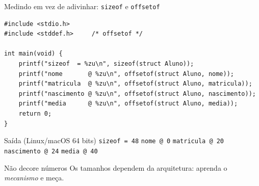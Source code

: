 \documentclass[aspectratio=169]{beamer}
\begin{document}
\begin{frame}[fragile]{Medindo em vez de adivinhar: \texttt{sizeof} e \texttt{offsetof}}
\begin{lstlisting}[basicstyle=\ttfamily\tiny]
#include <stdio.h>
#include <stddef.h>     /* offsetof */

int main(void) {
    printf("sizeof  = %zu\n", sizeof(struct Aluno));
    printf("nome       @ %zu\n", offsetof(struct Aluno, nome));
    printf("matricula  @ %zu\n", offsetof(struct Aluno, matricula));
    printf("nascimento @ %zu\n", offsetof(struct Aluno, nascimento));
    printf("media      @ %zu\n", offsetof(struct Aluno, media));
    return 0;
}
\end{lstlisting}
  \begin{exampleblock}{Saída (Linux/macOS 64 bits)}
    \texttt{sizeof = 48} \quad
    \texttt{nome @ 0} \quad \texttt{matricula @ 20} \quad
    \texttt{nascimento @ 24} \quad \texttt{media @ 40}
  \end{exampleblock}
  \begin{alertblock}{Não decore números}
    Os tamanhos dependem da arquitetura: aprenda o \emph{mecanismo} e meça.
  \end{alertblock}
\end{frame}
\end{document}
